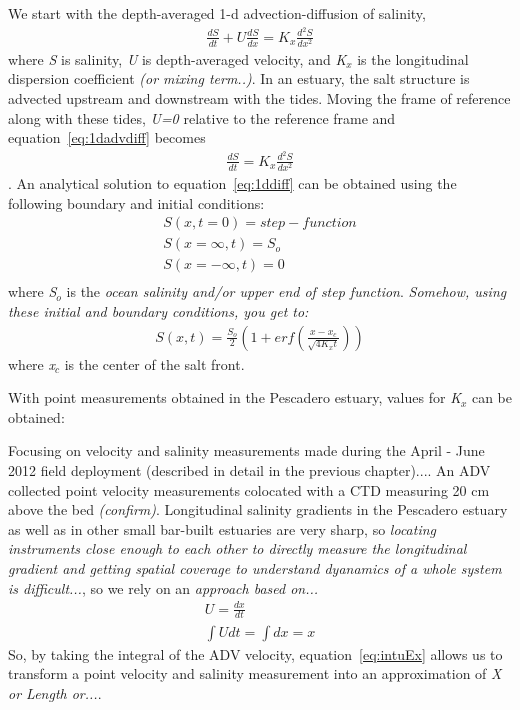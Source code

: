 We start with the depth-averaged 1-d advection-diffusion of salinity,
\begin{eqnarray}
\frac{dS}{dt} + U\frac{dS}{dx} = K_x\frac{d^2S}{dx^2} \label{eq:1dadvdiff}
\end{eqnarray}
where \emph{S} is salinity, \emph{U} is depth-averaged velocity, and \emph{K$_x$} is the longitudinal dispersion coefficient \emph{(or mixing term..)}. In an estuary, the salt structure is advected upstream and downstream with the tides. Moving the frame of reference along with these tides, \emph{U=0} relative to the reference frame and equation~\ref{eq:1dadvdiff} becomes
\begin{eqnarray}
\frac{dS}{dt} = K_x\frac{d^2S}{dx^2} \label{eq:1ddiff}
\end{eqnarray}
. An analytical solution to equation~\ref{eq:1ddiff} can be obtained using the following boundary and initial conditions:
\begin{eqnarray}
S(x,t=0) = step-function\label{eq:1ddiffIC}\\
S(x=\infty,t) = S_o\label{eq:1ddiffBC1}\\
S(x=-\infty,t) = 0\label{eq:1ddiffBC2}\\
\end{eqnarray}
where \emph{S$_o$} is the \emph{ocean salinity and/or upper end of step function}. \emph{Somehow, using these initial and boundary conditions, you get to:}
\begin{eqnarray}
S(x,t) = \frac{S_o}{2}(1+erf(\frac{x-x_c}{\sqrt{4K_xt}})) \label{eq:S}
\end{eqnarray}
where \emph{x$_c$} is the center of the salt front. 

With point measurements obtained in the Pescadero estuary, values for \emph{K$_x$} can be obtained: 

Focusing on velocity and salinity measurements made during the April - June 2012 field deployment (described in detail in the previous chapter).... An ADV collected point velocity measurements colocated with a CTD measuring 20 cm above the bed \emph{(confirm)}. Longitudinal salinity gradients in the Pescadero estuary as well as in other small bar-built estuaries are very sharp, so \emph{locating instruments close enough to each other to directly measure the longitudinal gradient and getting spatial coverage to understand dyanamics of a whole system is difficult...}, so we rely on an \emph{approach based on...}
\begin{eqnarray}
U = \frac{dx}{dt} \label{eq:uEdxdt}\\
\int{Udt} = \int{dx} = x \label{eq:intuEx}
\end{eqnarray}
So, by taking the integral of the ADV velocity, equation~\ref{eq:intuEx} allows us to transform a point velocity and salinity measurement into an approximation of \emph{X or Length or...}. 

